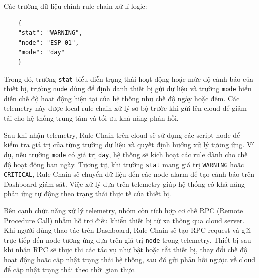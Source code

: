 Các trường dữ liệu chính rule chain xử lí logic:

\begin{verbatim}
    {
    "stat": "WARNING",
    "node": "ESP_01",
    "mode": "day"
    }
\end{verbatim}  

Trong đó, trường \texttt{stat} biểu diễn trạng thái hoạt động hoặc mức độ cảnh báo của thiết bị, trường \texttt{node} dùng để định danh thiết bị gửi dữ liệu và trường \texttt{mode} biểu diễn chế độ hoạt động hiện tại của hệ thống như chế độ ngày hoặc đêm. Các telemetry này được local rule chain xử lý sơ bộ trước khi gửi lên cloud để giảm tải cho hệ thống trung tâm và tối ưu khả năng phản hồi.

Sau khi nhận telemetry, Rule Chain trên cloud sẽ sử dụng các script node để kiểm tra giá trị của từng trường dữ liệu và quyết định hướng xử lý tương ứng. Ví dụ, nếu trường \texttt{mode} có giá trị \texttt{day}, hệ thống sẽ kích hoạt các rule dành cho chế độ hoạt động ban ngày. Tương tự, khi trường \texttt{stat} mang giá trị \texttt{WARNING} hoặc \texttt{CRITICAL}, Rule Chain sẽ chuyển dữ liệu đến các node alarm để tạo cảnh báo trên Dashboard giám sát. Việc xử lý dựa trên telemetry giúp hệ thống có khả năng phản ứng tự động theo trạng thái thực tế của thiết bị.

Bên cạnh chức năng xử lý telemetry, nhóm còn tích hợp cơ chế RPC (Remote Procedure Call) nhằm hỗ trợ điều khiển thiết bị từ xa thông qua cloud server. Khi người dùng thao tác trên Dashboard, Rule Chain sẽ tạo RPC request và gửi trực tiếp đến node tương ứng dựa trên giá trị \texttt{node} trong telemetry. Thiết bị sau khi nhận RPC sẽ thực thi các tác vụ như bật hoặc tắt thiết bị, thay đổi chế độ hoạt động hoặc cập nhật trạng thái hệ thống, sau đó gửi phản hồi ngược về cloud để cập nhật trạng thái theo thời gian thực.

